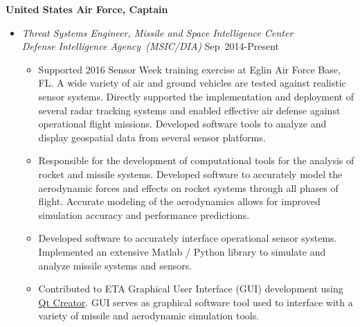 \textbf{United States Air Force, Captain}
\begin{itemize}

\item[] \textit{Threat Systems Engineer, Missile and Space Intelligence Center \\
                Defense Intelligence Agency~(MSIC/DIA)}
                \hfill {Sep~2014-Present}
        \begin{itemize}
            \item Supported 2016 Sensor Week training exercise at Eglin Air Force Base, FL.
            A wide variety of air and ground vehicles are tested against realistic sensor systems. 
            Directly supported the implementation and deployment of several radar tracking systems and enabled effective air defense against operational flight missions.
            Developed software tools to analyze and display geospatial data from several sensor platforms.
            \item Responsible for the development of computational tools for the analysis of rocket and missile systems.
            Developed software to accurately model the aerodynamic forces and effects on rocket systems through all phases of flight.
            Accurate modeling of the aerodynamics allows for improved simulation accuracy and performance predictions.
            \item Developed software to accurately interface operational sensor systems.
            Implemented an extensive Matlab / Python library to simulate and analyze missile systems and sensors. 
            \item Contributed to ETA Graphical User Interface (GUI) development using \href{https://www.qt.io/ide/}{Qt Creator}.
            GUI serves as graphical software tool used to interface with a variety of missile and aerodynamic simulation tools.
        \end{itemize}
        

\end{itemize}
